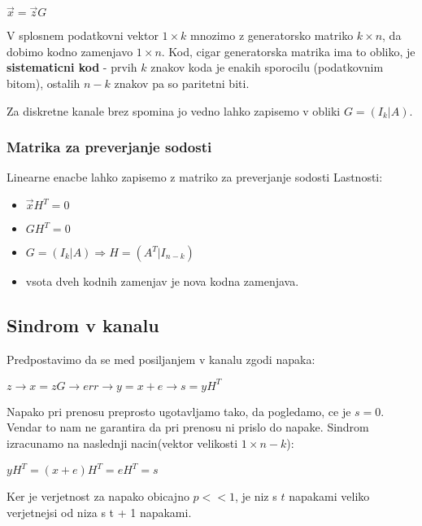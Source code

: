 \documentclass{article}
\begin{document}
\begin{multicols}{4}
\begin{center}
    \begin{math}
        \vec{x} = \vec{z}G
    \end{math}
\end{center}

V splosnem podatkovni vektor $1 \times k$ mnozimo z generatorsko matriko $k \times n$, da dobimo kodno zamenjavo
$1 \times n$. Kod, cigar generatorska matrika ima to obliko, je
\textbf{sistematicni kod} - prvih $k$ znakov koda je enakih sporocilu (podatkovnim bitom), ostalih $n-k$ znakov pa so
paritetni biti.

Za diskretne kanale brez spomina jo vedno lahko zapisemo v obliki $G = (I_k | A)$.

\subsubsection{Matrika za preverjanje sodosti}
Linearne enacbe lahko zapisemo z matriko za preverjanje sodosti
Lastnosti:
\begin{itemize}
    \item $\vec{x}H^T = 0$
    \item $GH^T = 0$
    \item $G = (I_k | A) \Rightarrow H = (A^T | I_{n-k})$
    \item vsota dveh kodnih zamenjav je nova kodna zamenjava.
\end{itemize}

\subsection{Sindrom v kanalu}
Predpostavimo da se med posiljanjem v kanalu zgodi napaka:
\begin{center}
    \begin{math}
        z \rightarrow x = zG \rightarrow err\rightarrow y = x + e \rightarrow s = yH^T
    \end{math}
\end{center}
Napako pri prenosu preprosto ugotavljamo tako, da pogledamo, ce je $s = 0$. Vendar to nam ne garantira da pri prenosu ni prislo do napake.
Sindrom izracunamo na naslednji nacin(vektor velikosti $1 \times n - k$):
\begin{center}
    \begin{math}
        yH^T = (x + e)H^T = eH^T = s
    \end{math}
\end{center}
Ker je verjetnost za napako obicajno $p << 1$, je niz s $t$ napakami veliko
verjetnejsi od niza s t + 1 napakami.


\end{multicols}
\end{document}
